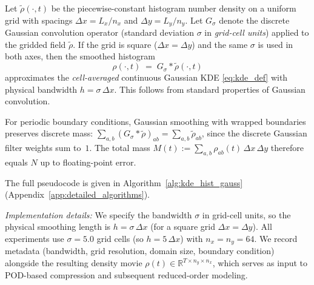 \begin{remark}
\label{claim:histogram_kde}
Let $\tilde\rho(\cdot,t)$ be the piecewise-constant histogram number density on a uniform grid with spacings
$\Delta x = L_x/n_x$ and $\Delta y = L_y/n_y$.
Let $G_\sigma$ denote the discrete Gaussian convolution operator (standard deviation $\sigma$ in \emph{grid-cell units}) applied to the gridded field $\tilde\rho$.
If the grid is square ($\Delta x=\Delta y$) and the same $\sigma$ is used in both axes, then the smoothed histogram
\begin{equation}
\rho(\cdot,t) \;=\; G_\sigma * \tilde\rho(\cdot,t)
\label{eq:smoothed_histogram}
\end{equation}
approximates the \emph{cell-averaged} continuous Gaussian KDE \eqref{eq:kde_def} with physical bandwidth $h=\sigma\,\Delta x$.
This follows from standard properties of Gaussian convolution.
\end{remark}

\begin{remark}
\label{rem:kde_mass}
For periodic boundary conditions, Gaussian smoothing with wrapped boundaries
preserves discrete mass: $\sum_{a,b} (G_\sigma * \tilde\rho)_{ab} = \sum_{a,b} \tilde\rho_{ab}$, since the discrete Gaussian filter weights sum to~$1$. The total mass $M(t) := \sum_{a,b} \rho_{ab}(t)\,\Delta x\,\Delta y$ therefore equals $N$ up to floating-point error.
\end{remark}

The full pseudocode is given in Algorithm~\ref{alg:kde_hist_gauss}
(Appendix~\ref{app:detailed_algorithms}).

\emph{Implementation details:} We specify the bandwidth $\sigma$ in grid-cell units, so the physical smoothing length is $h=\sigma\,\Delta x$ (for a square grid $\Delta x=\Delta y$).
All experiments use $\sigma=5.0$ grid cells (so $h=5\,\Delta x$) with $n_x=n_y=64$.
We record metadata (bandwidth, grid resolution, domain size, boundary condition) alongside the resulting density movie $\rho(t)\in\mathbb{R}^{T\times n_y\times n_x}$, which serves as input to POD-based compression and subsequent reduced-order modeling.

